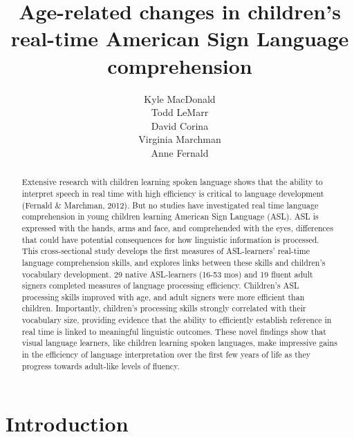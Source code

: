 \documentclass[12pt,]{article}
\title{Age-related changes in children's real-time American Sign Language
comprehension}
\author{Kyle MacDonald \\ Todd LeMarr \\ David Corina \\ Virginia Marchman \\ Anne Fernald}
\date{}
\begin{document}
\maketitle

\begin{abstract}
Extensive research with children learning spoken language shows that the
ability to interpret speech in real time with high efficiency is
critical to language development (Fernald \& Marchman, 2012). But no
studies have investigated real time language comprehension in young
children learning American Sign Language (ASL). ASL is expressed with
the hands, arms and face, and comprehended with the eyes, differences
that could have potential consequences for how linguistic information is
processed. This cross-sectional study develops the first measures of
ASL-learners' real-time language comprehension skills, and explores
links between these skills and children's vocabulary development. 29
native ASL-learners (16-53 mos) and 19 fluent adult signers completed
measures of language processing efficiency. Children's ASL processing
skills improved with age, and adult signers were more efficient than
children. Importantly, children's processing skills strongly correlated
with their vocabulary size, providing evidence that the ability to
efficiently establish reference in real time is linked to meaningful
linguistic outcomes. These novel findings show that visual language
learners, like children learning spoken languages, make impressive gains
in the efficiency of language interpretation over the first few years of
life as they progress towards adult-like levels of fluency.
\end{abstract}

\newpage

\section{Introduction}\label{introduction}
\end{document}
